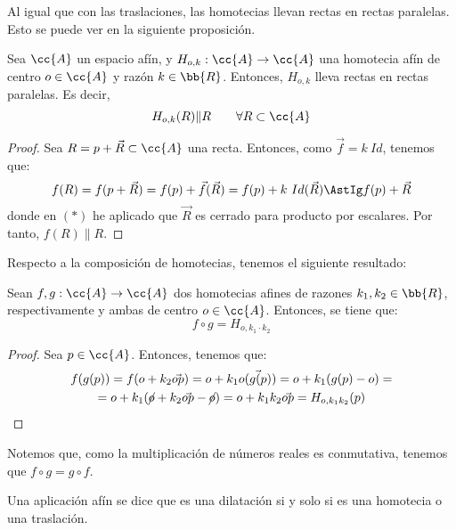 Al igual que con las traslaciones, las homotecias llevan rectas en rectas paralelas. Esto se puede ver en la siguiente proposición.
\begin{prop}
    Sea $\cc{A}$ un espacio afín, y $H_{o,k}:\cc{A}\to \cc{A}$ una homotecia afín de centro $o\in \cc{A}$ y razón $k\in \bb{R}$. Entonces, $H_{o,k}$ lleva rectas en rectas paralelas. Es decir,
    \begin{equation*}
        H_{o,k}(R)\| R \qquad \forall R\subset \cc{A}
    \end{equation*}
\end{prop}
\begin{proof}
    Sea $R=p+\vec{R}\subset \cc{A}$ una recta. Entonces, como $\vec{f}=k~Id$, tenemos que:
    \begin{equation*}
        f(R) = f(p+\vec{R}) = f(p) + \vec{f}(\vec{R}) = f(p) + k~Id(\vec{R}) \AstIg f(p) + \vec{R}
    \end{equation*}
    donde en $(\ast)$ he aplicado que $\vec{R}$ es cerrado para producto por escalares. Por tanto, $f(R)\| R$.
\end{proof}

Respecto a la composición de homotecias, tenemos el siguiente resultado:
\begin{prop}
    Sean $f,g:\cc{A}\to \cc{A}$ dos homotecias afines de razones $k_1,k_2\in \bb{R}$, respectivamente y ambas de centro $o\in \cc{A}$. Entonces, se tiene que:
    \begin{equation*}
        f\circ g = H_{o,k_1\cdot k_2}
    \end{equation*}
\end{prop}
\begin{proof}
    Sea $p\in \cc{A}$. Entonces, tenemos que:
    \begin{multline*}
        f(g(p)) = f(o+k_2\vec{op}) = o+k_1\vec{o(g(p))} = o + k_1(g(p)-o) =\\= o + k_1(\cancel{o}+k_2\vec{op}-\cancel{o}) = o + k_1k_2\vec{op} = H_{o,k_1k_2}(p) \qedhere
    \end{multline*}
\end{proof}
Notemos que, como la multiplicación de números reales es conmutativa, tenemos que $f\circ g = g\circ f$.


\begin{definicion}
    Una aplicación afín se dice que es una dilatación si y solo si es una homotecia o una traslación.
\end{definicion}

